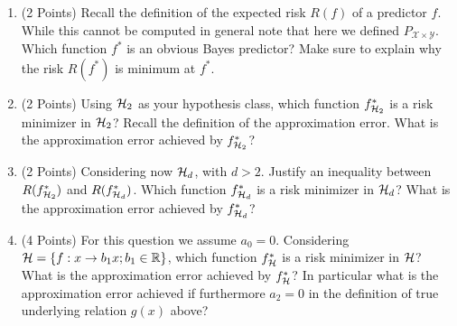\documentclass{article}
\newcommand{\bb}{b}
\begin{document}
\begin{enumerate}
    \item (2 Points) Recall the definition of the expected risk $R(f)$ of a predictor $f$. While this cannot be computed in general note that here we defined $P_{\mathcal{X} \times \mathcal{Y}}$. Which function $f^*$ is an obvious Bayes predictor? Make sure to explain why the risk $R(f^*)$ is minimum at $f^*$.

    \item (2 Points) Using ${\mathcal{H}}_2$ as your hypothesis class, which function $f^*_{{\mathcal{H}}_2}$ is a risk minimizer in ${\mathcal{H}}_2$? Recall the definition of the approximation error. What is the approximation error achieved by $f^*_{{\mathcal{H}}_2}$?


    \item (2 Points) Considering now ${\mathcal{H}}_d$, with $d>2$. Justify an inequality between $R(f^*_{{\mathcal{H}}_2})$ and $R(f^*_{{\mathcal{H}}_d})$. Which function $f^*_{{\mathcal{H}}_d}$ is a risk minimizer in ${\mathcal{H}}_d$? What is the approximation error achieved by $f^*_{{\mathcal{H}}_d}$?

    
    \item (4 Points) For this question we assume $a_0 = 0$. Considering $\gH= \left\{f: x \rightarrow \bb_1 x;  \bb_1 \in \sR\right\}$, which function $f^*_{{\mathcal{H}}}$ is a risk minimizer in ${\mathcal{H}}$? What is the approximation error achieved by $f^*_{{\mathcal{H}}}$? In particular what is the approximation error achieved if furthermore $a_2=0$ in the definition of true underlying relation $g(x)$ above?

\setcounter{saveenum}{\value{enumi}}
\end{enumerate}
\end{document}
